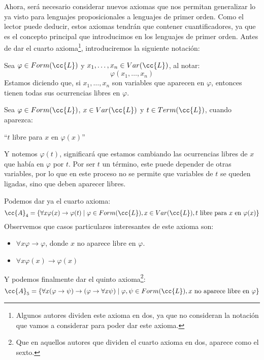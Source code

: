 Ahora, será necesario considerar nuevos axiomas que nos permitan generalizar lo ya visto para lenguajes proposicionales a lenguajes de primer orden. Como el lector puede deducir, estos axiomas tendrán que contener cuantificadores, ya que es el concepto principal que introducimos en los lenguajes de primer orden. Antes de dar el cuarto axioma\footnote{Algunos autores dividen este axioma en dos, ya que no consideran la notación que vamos a considerar para poder dar este axioma.}, introduciremos la siguiente notación:

\begin{notacion}
    Sea $\varphi \in Form(\cc{L})$ y $x_1,\ldots,x_n \in Var(\cc{L})$, al notar:
    \begin{equation*}
        \varphi(x_1,\ldots,x_n)
    \end{equation*}
    Estamos diciendo que, si $x_1,\ldots,x_n$ son variables que aparecen en $\varphi$, entonces tienen todas sus ocurrencias libres en $\varphi$.
\end{notacion}

\begin{notacion}
    Sea $\varphi \in Form(\cc{L})$, $x\in Var(\cc{L})$ y $t\in Term(\cc{L})$, cuando aparezca:
    \begin{center}
        ``$t$ libre para $x$ en $\varphi(x)$''
    \end{center}
    Y notemos $\varphi(t)$, significará que estamos cambiando las ocurrencias libres de $x$ que había en $\varphi$ por $t$. Por ser $t$ un término, este puede depender de otras variables, por lo que en este proceso no se permite que variables de $t$ se queden ligadas, sino que deben aparecer libres.
\end{notacion}
Podemos dar ya el cuarto axioma:
\begin{equation*}
    \cc{A}_4 = \{\forall x\varphi(x)\to\varphi(t) \mid \varphi \in Form(\cc{L}), x\in Var(\cc{L}), t \text{\ libre para\ } x \text{\ en\ } \varphi(x)\}
\end{equation*}
Observemos que casos particulares interesantes de este axioma son:
\begin{itemize}
    \item $\forall x\varphi \to \varphi$, donde $x$ no aparece libre en $\varphi$.
    \item $\forall x\varphi(x)\to \varphi(x)$
\end{itemize}

Y podemos finalmente dar el quinto axioma\footnote{Que en aquellos autores que dividen el cuarto axioma en dos, aparece como el sexto.}:
\begin{equation*}
    \cc{A}_5 = \{\forall x(\varphi\to\psi)\to(\varphi\to\forall x\psi) \mid \varphi,\psi \in Form(\cc{L}), x \text{\ no aparece libre en\ } \varphi\}
\end{equation*}

